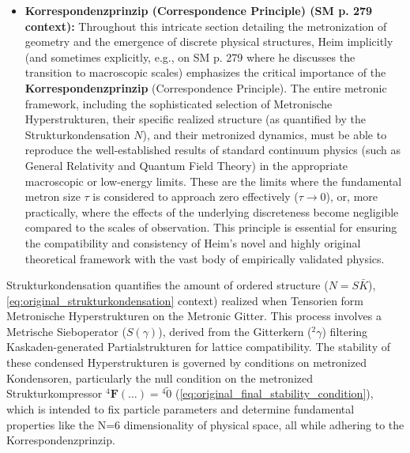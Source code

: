 \documentclass[12pt]{article}
\newcommand{\q}[1]{\enquote{#1}}
\newcommand{\metron}{\tau}
\newcommand{\metrischesieboperator}{S(\gamma)}
\newcommand{\metronisiertekondensor}[1]{{}^{#1}\mathbf{F}} %
\begin{document}
\begin{itemize}
    The condition that this metronized operator \( \metronisiertekondensor{4} \) must equal a null tensor of 4th rank (\( {}^{4}\tilde{0} \)) signifies a state of minimal internal geometric \q{stress,} maximal coherence, or optimal stability for the Metronische Hyperstruktur. This equation, when solved for the parameters \(q\) (and other intrinsic parameters of the Hyperstruktur), is implied by Heim to fix these parameters and thereby ultimately determine the specific properties (like mass spectra) of the stable elementary particles. It is also from conditions like this that Heim derives fundamental results such as the N=6 dimensionality of the physical subspace in which these Hyperstrukturen are stable, as well as the combinatorial factor defining simple metronic tensoria:
    \begin{equation}
    \mathrm{L_p} = \binom{6}{\mathrm{p}} \tag{100a}
    \end{equation}

    \item \textbf{Korrespondenzprinzip (Correspondence Principle) (SM p. 279 context):}
    Throughout this intricate section detailing the metronization of geometry and the emergence of discrete physical structures, Heim implicitly (and sometimes explicitly, e.g., on SM p. 279 where he discusses the transition to macroscopic scales) emphasizes the critical importance of the \textbf{Korrespondenzprinzip} (Correspondence Principle). The entire metronic framework, including the sophisticated selection of Metronische Hyperstrukturen, their specific realized structure (as quantified by the Strukturkondensation \( N \)), and their metronized dynamics, must be able to reproduce the well-established results of standard continuum physics (such as General Relativity and Quantum Field Theory) in the appropriate macroscopic or low-energy limits. These are the limits where the fundamental metron size \( \metron \) is considered to approach zero effectively (\(\metron \to 0 \)), or, more practically, where the effects of the underlying discreteness become negligible compared to the scales of observation. This principle is essential for ensuring the compatibility and consistency of Heim's novel and highly original theoretical framework with the vast body of empirically validated physics.
\end{itemize}

Strukturkondensation quantifies the amount of ordered structure (\(N = S\bar{K}\)), \eqref{eq:original_strukturkondensation} context) realized when Tensorien form Metronische Hyperstrukturen on the Metronic Gitter. This process involves a Metrische Sieboperator (\(\metrischesieboperator\)), derived from the Gitterkern (\({}^2\gamma\)) filtering Kaskaden-generated Partialstrukturen for lattice compatibility. The stability of these condensed Hyperstrukturen is governed by conditions on metronized Kondensoren, particularly the null condition on the metronized Strukturkompressor \( \metronisiertekondensor{4}(\dots) = {}^{4}\tilde{0} \) (\eqref{eq:original_final_stability_condition}), which is intended to fix particle parameters and determine fundamental properties like the N=6 dimensionality of physical space, all while adhering to the Korrespondenzprinzip.
\end{document}
